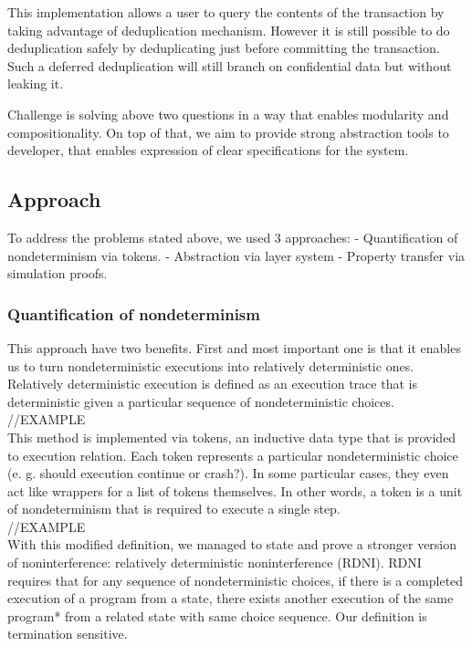\documentclass[onecolumn]{paper}
\begin{document}
This implementation allows a user to query the contents of the transaction by taking advantage of deduplication mechanism. However it is still possible to do deduplication safely by deduplicating just before committing the transaction. Such a deferred deduplication will still branch on confidential data but without leaking it.

Challenge is solving above two questions in a way that enables modularity and compositionality. On top of that, we aim to provide strong abstraction tools to developer, that enables expression of clear specifications for the system.

\subsection*{Approach}
To address the problems stated above, we used 3 approaches:
- Quantification of nondeterminism via tokens.
- Abstraction via layer system
- Property transfer via simulation proofs.

\subsubsection*{Quantification of nondeterminism}
This approach have two benefits. First and most important one is that it enables us to
turn nondeterministic executions into relatively deterministic ones. 
Relatively deterministic execution is defined as an execution trace that is deterministic given a particular sequence of nondeterministic choices.\\

//EXAMPLE\\

This method is implemented via tokens, an inductive data type that is provided to execution relation. Each token represents a particular nondeterministic choice (e. g. should execution continue or crash?). In some particular cases, they even act like wrappers for a list of tokens themselves. In other words, a token is a unit of nondeterminism that is required to execute a single step.\\

//EXAMPLE\\

With this modified definition, we managed to state and prove a stronger version of noninterference: relatively deterministic noninterference (RDNI). RDNI requires that for any sequence of nondeterministic choices, if there is a completed execution of a program from a state, there exists another execution of the same program* from a related state with same choice sequence. Our definition is termination sensitive.
\end{document}
